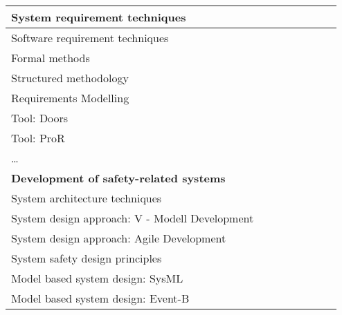 \documentclass[a4paper, 11pt]{article}
\begin{document}
\begin{center}
\begin{longtable}{|r|r|r|r|r|r|r|r|}
    \multicolumn{1}{|l|}{System requirement techniques} & \multicolumn{1}{l|}{} &       &       &       &       &       &  \bigstrut[b]\\
    \hline
    \multicolumn{1}{|l|}{Software requirement techniques} & \multicolumn{1}{l|}{} &       &       &       &       &       &  \bigstrut\\
    \hline
    \multicolumn{1}{|l|}{Formal methods} & \multicolumn{1}{l|}{} &       &       &       &       &       &  \bigstrut\\
    \hline
    \multicolumn{1}{|l|}{Structured methodology} & \multicolumn{1}{l|}{} &       &       &       &       &       &  \bigstrut\\
    \hline
    \multicolumn{1}{|l|}{Requirements Modelling} & \multicolumn{1}{l|}{} &       &       &       &       &       &  \bigstrut\\
    \hline
    \multicolumn{1}{|l|}{Tool: Doors } & \multicolumn{1}{l|}{} &       &       &       &       &       &  \bigstrut\\
    \hline
    \multicolumn{1}{|l|}{Tool: ProR} & \multicolumn{1}{l|}{} &       &       &       &       &       &  \bigstrut\\
    \hline
    \multicolumn{1}{|l|}{…} & \multicolumn{1}{l|}{} &       &       &       &       &       &  \bigstrut[t]\\
    \multicolumn{1}{|l|}{\textbf{Development of safety-related systems}} & \multicolumn{1}{c|}{\textbf{}} &       &       &       &       &       &  \\
    \multicolumn{1}{|l|}{System architecture techniques} & \multicolumn{1}{c|}{} &       &       &       &       &       &  \bigstrut[b]\\
    \hline
    \multicolumn{1}{|l|}{System design approach: V - Modell Development} & \multicolumn{1}{c|}{} &       &       &       &       &       &  \bigstrut\\
    \hline
    \multicolumn{1}{|l|}{System design approach: Agile Development} & \multicolumn{1}{c|}{} &       &       &       &       &       &  \bigstrut\\
    \hline
    \multicolumn{1}{|l|}{System safety design principles} & \multicolumn{1}{c|}{} &       &       &       &       &       &  \bigstrut\\
    \hline
    \multicolumn{1}{|l|}{Model based system design: SysML} & \multicolumn{1}{c|}{} &       &       &       &       &       &  \bigstrut\\
    \hline
    \multicolumn{1}{|l|}{Model based system design: Event-B} & \multicolumn{1}{c|}{} &       &       &       &       &       &  \bigstrut\\

\end{longtable}
\end{center}
\end{document}
